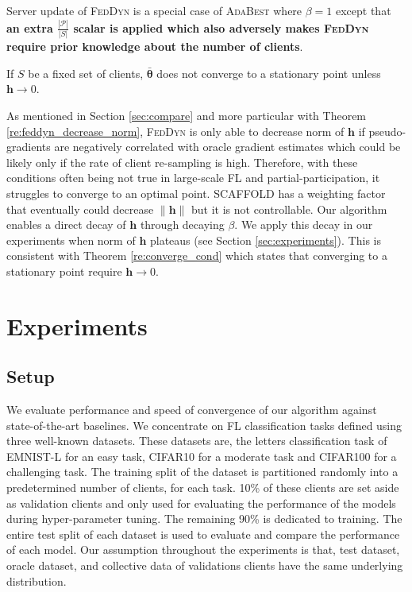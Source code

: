 \documentclass[runningheads]{llncs}
\def\vtheta{{\bm{\theta}}}
\def\vh{{\bm{h}}}
\def\gP{{\mathcal{P}}}
\newcommand*\mean[1]{\bar{#1}}
\newcommand{\scaffold}{\textsc{SCAFFOLD}\xspace}
\newcommand{\feddyn}{\textsc{FedDyn}\xspace}
\newcommand{\ours}{\textsc{AdaBest}\xspace}
\def\cifart{{\textsc{CIFAR10}}}
\def\cifarh{{\textsc{CIFAR100}}}
\def\emnist{{\textsc{EMNIST-L}}}
\begin{document}
\begin{remark}
\label{re:spectrum}
Server update of \feddyn is a special case of \ours where $\beta=1$ except that \textbf{an extra $\frac{|\gP|}{|S|}$ scalar is applied which also adversely makes \feddyn require prior knowledge about the number of clients}.
\end{remark}

\begin{theorem}
\label{re:converge_cond}
If $S$ be a fixed set of clients, $\mean{\vtheta}$ does not converge to a stationary point unless $\vh \rightarrow 0$.
\end{theorem}
As mentioned in Section \ref{sec:compare} and more particular with Theorem \ref{re:feddyn_decrease_norm}, \feddyn is only able to decrease norm of $\vh$ if pseudo-gradients are negatively correlated with oracle gradient estimates which could be likely only if the rate of client re-sampling is high. Therefore, with these conditions often being not true in large-scale FL and partial-participation, it struggles to converge to an optimal point. \scaffold has a weighting factor that eventually could decrease $\|\vh\|$ but it is not controllable. Our algorithm enables a direct decay of $\vh$ through decaying $\beta$. We apply this decay in our experiments when norm of $\vh$ plateaus (see Section \ref{sec:experiments}). This is consistent with Theorem \ref{re:converge_cond} which states that converging to a stationary point require $\vh \rightarrow 0$. 


\section{Experiments}

\subsection{Setup}
We evaluate performance and speed of convergence of our algorithm against state-of-the-art baselines. We concentrate on FL classification tasks defined using three well-known datasets. These datasets are, the letters classification task of \emnist{} \cite{lecun1998gradient} for an easy task, \cifart{} \cite{krizhevsky2009learning} for a moderate task and \cifarh{} \cite{krizhevsky2009learning} for a challenging task. The training split of the dataset is partitioned randomly into a predetermined number of clients, for each task. 10\% of these clients are set aside as validation clients and only used for evaluating the performance of the models during hyper-parameter tuning. The remaining 90\% is dedicated to training. The entire test split of each dataset is used to evaluate and compare the performance of each model. Our assumption throughout the experiments is that, test dataset, oracle dataset, and collective data of validations clients have the same underlying distribution. 
\end{document}

